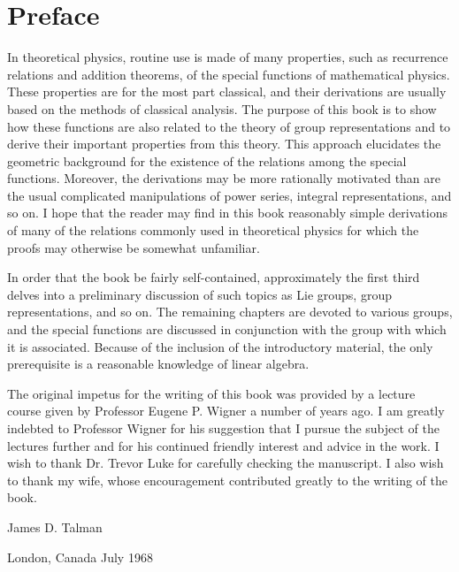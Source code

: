 \chapter*{Preface}

In theoretical physics, routine use is made of many properties, such as recurrence relations and addition theorems, of the special functions of mathematical physics. These properties are for the most part classical, and their derivations are usually based on the methods of classical analysis. The purpose of this book is to show how these functions are also related to the theory of group representations and to derive their important properties from this theory. This approach elucidates the geometric background for the existence of the relations among the special functions. Moreover, the derivations may be more rationally motivated than are the usual complicated manipulations of power series, integral representations, and so on. I hope that the reader may find in this book reasonably simple derivations of many of the relations commonly used in theoretical physics for which the proofs may otherwise be somewhat unfamiliar.

In order that the book be fairly self-contained, approximately the first third delves into a preliminary discussion of such topics as Lie groups, group representations, and so on. The remaining chapters are devoted to various groups, and the special functions are discussed in conjunction with the group with which it is associated. Because of the inclusion of the introductory material, the only prerequisite is a reasonable knowledge of linear algebra.

The original impetus for the writing of this book was provided by a lecture course given by Professor Eugene P. Wigner a number of years ago. I am greatly indebted to Professor Wigner for his suggestion that I pursue the subject of the lectures further and for his continued friendly interest and advice in the work. I wish to thank Dr. Trevor Luke for carefully checking the manuscript. I also wish to thank my wife, whose encouragement contributed greatly to the writing of the book.

\qquad \qquad \qquad \qquad \qquad \qquad \qquad \qquad \qquad \qquad \qquad \qquad \qquad James D. Talman

London, Canada
July 1968

\endinput